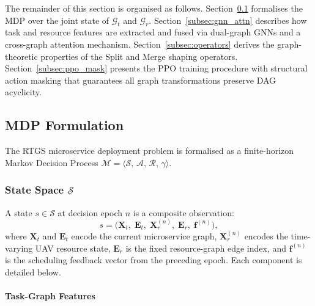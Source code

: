 The remainder of this section is organised as follows.
Section~\ref{subsec:mdp} formalises the MDP over the joint state of
$\mathcal{G}_t$ and $\mathcal{G}_r$.
Section~\ref{subsec:gnn_attn} describes how task and resource
features are extracted and fused via dual-graph GNNs and a
cross-graph attention mechanism.
Section~\ref{subsec:operators} derives the graph-theoretic
properties of the Split and Merge shaping operators.
Section~\ref{subsec:ppo_mask} presents the PPO training procedure
with structural action masking that guarantees all graph
transformations preserve DAG acyclicity.

\subsection{MDP Formulation}
\label{subsec:mdp}

The RTGS microservice deployment problem is formalised as a finite-horizon
Markov Decision Process
$\mathcal{M} = \langle\mathcal{S},\,\mathcal{A},\,\mathcal{R},\,\gamma\rangle$.

\subsubsection{State Space $\mathcal{S}$}
\label{subsubsec:state}

A state $s \in \mathcal{S}$ at decision epoch $n$ is a composite
observation:
\begin{equation}
  s =
  \bigl(
    \mathbf{X}_t,\;\mathbf{E}_t,\;
    \mathbf{X}_r^{(n)},\;\mathbf{E}_r,\;
    \mathbf{f}^{(n)}
  \bigr),
  \label{eq:state_full}
\end{equation}
where $\mathbf{X}_t$ and $\mathbf{E}_t$ encode the current microservice
graph, $\mathbf{X}_r^{(n)}$ encodes the time-varying UAV resource state,
$\mathbf{E}_r$ is the fixed resource-graph edge index, and
$\mathbf{f}^{(n)}$ is the scheduling feedback vector from the preceding
epoch.
Each component is detailed below.

\paragraph{Task-Graph Features}

